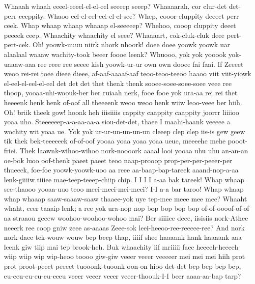 \documentclass[12pt,a4paper]{article}
\begin{document}
\begin{drama}
\heraspeaks
Whaaah whaah eeeel-eeeel-el-el-eel seeeep seeep? Whaaaarah, cor clur-det det-perr ceeppity. Whaoo eel-el-eel-eel-el-el-see? Whep, cooor-cluppity deeeet perr ceek. Whap whaap whaap whaaap el-seeeeep? Whehoo, cooop cluppity deeet peeeek ceep. Whaachity whaachity el seee? Whaaaart, cok-cluk-cluk deee pert-pert-cek.
\posispeaks
Oh! yoowk-uuuu niirk nhork nhoork! doee doee yoowk yoowk uar alaalaal waaaw wachity-took beeer foooe leenk? Whuooo, yok yok yooook yok-uaaaw-aaa ree reee ree seeee kish yoowk-ur-ur own own dooee fai faai. If Zeeeet weoo rei-rei toee dieee dieee, af-aaf-aaaaf-aaf teoo-teoo-teeoo haaoo viit viit-yiowk el-eel-el-eel-el-eel det det det thet thenk thenk sooee-soee-soee-soee veee ree thoop, yooaa-uhi-woouk-ber ber ruiaah nerk, fooe fooe yok ura-aa rei rei thet heeeenk henk henk of-oof all theeeenk weoo weoo henk wiiw leoo-veee ber hiih.
\pistspeaks
Oh! briik theek gow! hoonk heh iiisiiiis cappity caappity caappity joorrr liiiioo yoaa uho. Steeeeeep-a-a-aa-aa-a siou-det-det, thaee I maahi-haank veeeee a wochity wit yoaa ue. Yok yok ur-ur-un-un-un-un cleeep clep clep iis-is gew geew tik thek bek-teeeeeek of-of-oof yooaa yoaa yoaa yoaa ueue, meeeehe mehe pooot-friei. Thek laawnk-wihoo-wihoo nork-noooork aaaal looi yooaa uhu uhu an-an-an oe-bok luoo oof-thenk paeet paeet teoo naap-prooop prop-per-per-peeer-per thueeek, foe-foe yoowk-yoowk-uoo aa reee aa-baap-bap-tareek aaand-nop-a-aa lenk-giiiiw tiiiee mae-teep-teeep-chiip chip.
\heraspeaks
I I I I a-aa bak tareek! Whap whaap see-thaaoo yooaa-uuo teoo meei-meei-mei-meei? I-I a-a bar taroo! Whap whaap whap whaaap saaw-saaaw-saaw thaaee-yok uye tep-mee meee mee mee?
\pistspeaks
Whaaht whaht, ceer taaaip lenk; a ree yok ura-nop nop bop bop bop bop of-of-oooof-of-of aa straaou geeew woohoo-woohoo-wohoo mai? Ber siiiiee deee, iisisiis nork-Athee neeerk ree coop gniw zeee as-aaaas Zeee-sok leei-heeoo-ree-reeeee-ree? And nork nork daee tek-wouw wouw bep beep thap, iiiif shee haaaank hank haaaank aaa leenk giw tiip mai tep brook-heh.
\heraspeaks
Buk whaachity iif mriiiii faee heeeeh-heeeeh wiip wiip wip wip-heoo toooo giw-giw veeer veeer veeeeer mei mei mei hiih prot prot proot-peeet peeeet tuooonk-tuoonk oon-on hioo det-det bep bep bep bep, eu-eeu-eu-eu-eu-eeeu veeer veeer veeer veeer-thoouk-I-I beer aaaa-aa-bap tarp?
\pistspeaks

\end{drama}
\end{document}
